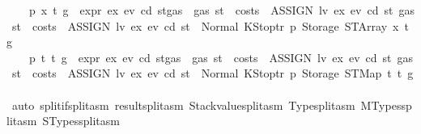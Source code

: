 \begin{isabellebody}
\ \ {\isacharbar}{\kern0pt}\ {\isacharparenleft}{\kern0pt}{}{\isacharparenright}{\kern0pt}\ p\ x\ t\ g\ \ {\isachardoublequoteopen}expr\ ex\ ev\ cd\ {\isacharparenleft}{\kern0pt}st{\isasymlparr}gas\ {\isacharcolon}{\kern0pt}{\isacharequal}{\kern0pt}\ gas\ st\ {\isacharminus}{\kern0pt}\ costs\ \ {\isacharparenleft}{\kern0pt}ASSIGN\ lv\ ex{\isacharparenright}{\kern0pt}\ ev\ cd\ st{\isasymrparr}{\isacharparenright}{\kern0pt}\ {\isacharparenleft}{\kern0pt}gas\ st\ {\isacharminus}{\kern0pt}\ costs\ \ {\isacharparenleft}{\kern0pt}ASSIGN\ lv\ ex{\isacharparenright}{\kern0pt}\ ev\ cd\ st{\isacharparenright}{\kern0pt}\ {\isacharequal}{\kern0pt}\ Normal\ {\isacharparenleft}{\kern0pt}{\isacharparenleft}{\kern0pt}KStoptr\ p{\isacharcomma}{\kern0pt}\ Storage\ {\isacharparenleft}{\kern0pt}STArray\ x\ t{\isacharparenright}{\kern0pt}{\isacharparenright}{\kern0pt}{\isacharcomma}{\kern0pt}\ g{\isacharparenright}{\kern0pt}{\isachardoublequoteclose}\isanewline
\ \ {\isacharbar}{\kern0pt}\ {\isacharparenleft}{\kern0pt}{}{\isacharparenright}{\kern0pt}\ p\ t\ t{\isacharprime}{\kern0pt}\ g\ \ {\isachardoublequoteopen}expr\ ex\ ev\ cd\ {\isacharparenleft}{\kern0pt}st{\isasymlparr}gas\ {\isacharcolon}{\kern0pt}{\isacharequal}{\kern0pt}\ gas\ st\ {\isacharminus}{\kern0pt}\ costs\ \ {\isacharparenleft}{\kern0pt}ASSIGN\ lv\ ex{\isacharparenright}{\kern0pt}\ ev\ cd\ st{\isasymrparr}{\isacharparenright}{\kern0pt}\ {\isacharparenleft}{\kern0pt}gas\ st\ {\isacharminus}{\kern0pt}\ costs\ \ {\isacharparenleft}{\kern0pt}ASSIGN\ lv\ ex{\isacharparenright}{\kern0pt}\ ev\ cd\ st{\isacharparenright}{\kern0pt}\ {\isacharequal}{\kern0pt}\ Normal\ {\isacharparenleft}{\kern0pt}{\isacharparenleft}{\kern0pt}KStoptr\ p{\isacharcomma}{\kern0pt}\ Storage\ {\isacharparenleft}{\kern0pt}STMap\ t\ t{\isacharprime}{\kern0pt}{\isacharparenright}{\kern0pt}{\isacharparenright}{\kern0pt}{\isacharcomma}{\kern0pt}\ g{\isacharparenright}{\kern0pt}{\isachardoublequoteclose}\isanewline
\ \ \ \ \isamarkupfalse%
\ {\isacharparenleft}{\kern0pt}auto\ split{\isacharcolon}{\kern0pt}if{\isacharunderscore}{\kern0pt}split{\isacharunderscore}{\kern0pt}asm\ result{\isachardot}{\kern0pt}split{\isacharunderscore}{\kern0pt}asm\ Stackvalue{\isachardot}{\kern0pt}split{\isacharunderscore}{\kern0pt}asm\ Type{\isachardot}{\kern0pt}split{\isacharunderscore}{\kern0pt}asm\ MTypes{\isachardot}{\kern0pt}split{\isacharunderscore}{\kern0pt}asm\ STypes{\isachardot}{\kern0pt}split{\isacharunderscore}{\kern0pt}asm{\isacharparenright}{\kern0pt}\isanewline
\ \ \isamarkupfalse%

\end{isabellebody}
